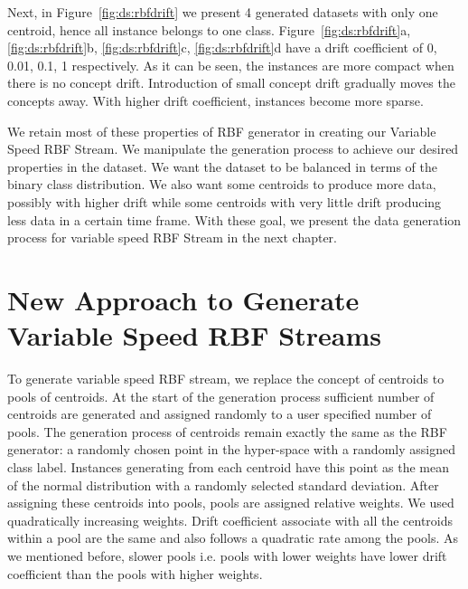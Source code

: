 Next, in Figure~\ref{fig:ds:rbfdrift} we present 4 generated datasets with only one centroid, hence all instance belongs to one class. Figure~\ref{fig:ds:rbfdrift}a, \ref{fig:ds:rbfdrift}b, \ref{fig:ds:rbfdrift}c, \ref{fig:ds:rbfdrift}d have a drift coefficient of 0, 0.01, 0.1, 1 respectively. As it can be seen, the instances are more compact when there is no concept drift. Introduction of small concept drift gradually moves the concepts away. With higher drift coefficient, instances become more sparse.

We retain most of these properties of RBF generator in creating our Variable Speed RBF Stream. We manipulate the generation process to achieve our desired properties in the dataset. We want the dataset to be balanced in terms of the binary class distribution. We also want some centroids to produce more data, possibly with higher drift while some centroids with very little drift producing less data in a certain time frame. With these goal, we present the data generation process for variable speed RBF Stream in the next chapter.

\section{New Approach to Generate Variable Speed RBF Streams}
To generate variable speed RBF stream, we replace the concept of centroids to pools of centroids. At the start of the generation process sufficient number of centroids are generated and assigned randomly to a user specified number of pools. The generation process of centroids remain exactly the same as the RBF generator: a randomly chosen point in the hyper-space with a randomly assigned class label. Instances generating from each centroid have this point as the mean of the normal distribution with a randomly selected standard deviation. After assigning these centroids into pools, pools are assigned relative weights. We used quadratically increasing weights. Drift coefficient associate with all the centroids within a pool are the same and also follows a quadratic rate among the pools. As we mentioned before, slower pools i.e. pools with lower weights have lower drift coefficient than the pools with higher weights.

